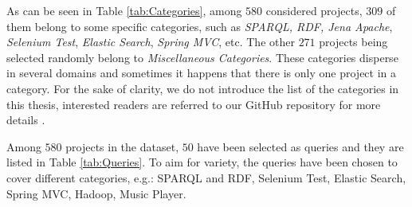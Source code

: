 As can be seen in Table \ref{tab:Categories}, among $580$ considered projects, $309$ of them belong to some specific categories, such as \emph{SPARQL, RDF, Jena Apache}, \emph{Selenium Test}, \emph{Elastic Search}, \emph{Spring MVC}, etc. The other $271$ projects being selected randomly belong to \emph{Miscellaneous Categories}. These categories disperse in several domains and sometimes it happens that there is only one project in a category. For the sake of clarity, we do not introduce the list of the categories in this thesis, interested readers are referred to our GitHub repository for more details \cite{CROSSSIM-DATA}.





Among $580$ projects in the dataset, $50$ have been selected as queries and they are listed in Table \ref{tab:Queries}. To aim for variety, the queries have been chosen to cover different categories, e.g.: SPARQL and RDF, Selenium Test, Elastic Search, Spring MVC, Hadoop, Music Player.

